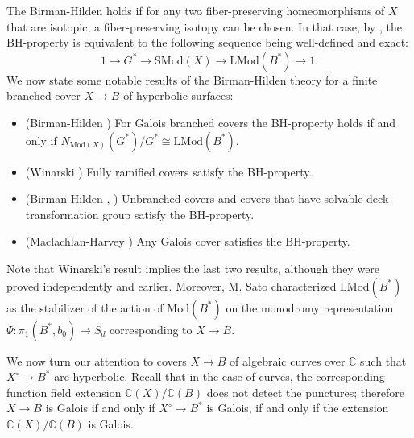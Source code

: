 \documentclass[10pt]{amsart}
\theoremstyle{definition}
\begin{document}
The Birman-Hilden holds if for any two fiber-preserving homeomorphisms of $X$ that are isotopic, a fiber-preserving isotopy can be chosen. In that case, by \cite[Prop 3.1]{MR4275077}, the BH-property is equivalent to the following sequence being well-defined and exact:
  \begin{equation}\label{eq:BH-property}
    1 \rightarrow G^* \rightarrow \mathrm{SMod}(X) \rightarrow \mathrm{LMod}(B^*) \rightarrow 1.
  \end{equation}
We now state some notable results of the Birman-Hilden theory for a finite branched cover $X\rightarrow B$ of hyperbolic surfaces:
\begin{itemize}
    \item (Birman-Hilden \cite[Prop. 3.1]{MR4275077}) For Galois branched covers the BH-property holds if and only if $N_{\mathrm{Mod}(X)}(G^*)/G^* \cong \mathrm{LMod}(B^*)$.
    \item (Winarski \cite{MR3370031}) Fully ramified covers satisfy the BH-property.
    \item (Birman-Hilden \cite{Birman1972-pg}, \cite{Birman1973-ea}) Unbranched covers and covers that have solvable deck transformation group satisfy the BH-property.
    \item (Maclachlan-Harvey \cite{MR374414}) Any Galois cover satisfies the BH-property.
\end{itemize}
  Note that Winarski's result implies the last two results, although they were proved independently and earlier. Moreover, M. Sato \cite[Prop. 1.2]{SATO_2009} characterized 
  $\mathrm{LMod}(B^*)$ as the stabilizer of the action of $\mathrm{Mod}(B^*)$ on the monodromy representation $\Psi \colon \pi_1(B^*,b_0)\rightarrow S_d$ corresponding to $X\rightarrow B$.
  
  We now turn our attention to covers $X\rightarrow B$ of algebraic curves over $\mathbb{C}$ such that $X^\circ\rightarrow B^*$ are hyperbolic. Recall that in the case of curves, the corresponding function field extension $\mathbb{C}(X)/\mathbb{C}(B)$ does not detect the punctures; therefore $X\rightarrow B$ is Galois if and only if $X^\circ \rightarrow B^*$ is Galois, if and only if the extension $\mathbb{C}(X)/\mathbb{C}(B)$ is Galois.
  
\end{document}
